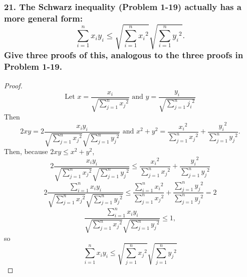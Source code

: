\documentclass{article}
\begin{document}
\subsubsection*{21. The Schwarz inequality (Problem 1-19) actually has a more general form: \[\sum_{i=1}^{n}x_iy_i \le \sqrt{\sum_{i=1}^{n}{x_i}^2}\sqrt{\sum_{i=1}^{n}{y_i}^2}.\] Give three proofs of this, analogous to the three proofs in Problem 1-19.}

\begin{proof}
	\[\text{Let }x = \frac{x_i}{\sqrt{\sum_{j=1}^{n}{x_j}^2}}\text{ and } y = \frac{y_i}{\sqrt{\sum_{j=1}^{n}{j_i}^2}}\]
	Then \[2xy = 2\frac{x_iy_i}{\sqrt{\sum_{j=1}^{n}{x_j}^2}\sqrt{\sum_{j=1}^{n}{y_j}^2}}\text{ and } x^2 + y^2 = \frac{{x_i}^2}{\sum_{j=1}^{n}{x_j}^2} + \frac{{y_i}^2}{\sum_{j=1}^{n}{y_j}^2}.\]
	Then, because $2xy \le x^2 + y^2$,
	\[2\frac{x_iy_i}{\sqrt{\sum_{j=1}^{n}{x_j}^2}\sqrt{\sum_{j=1}^{n}{y_j}^2}} \le \frac{{x_i}^2}{\sum_{j=1}^{n}{x_j}^2} + \frac{{y_i}^2}{\sum_{j=1}^{n}{y_j}^2}\]
	\[2\frac{\sum_{i=1}^{n}x_iy_i}{\sqrt{\sum_{j=1}^{n}{x_j}^2}\sqrt{\sum_{j=1}^{n}{y_j}^2}} \le \frac{\sum_{i=1}^{n}{x_i}^2}{\sum_{j=1}^{n}{x_j}^2} + \frac{\sum_{j=1}^{n}{y_j}^2}{\sum_{j=1}^{n}{y_j}^2} = 2\]
	\[\frac{\sum_{i=1}^{n}x_iy_i}{\sqrt{\sum_{j=1}^{n}{x_j}^2}\sqrt{\sum_{j=1}^{n}{y_j}^2}} \le 1,\] so \[\sum_{i=1}^{n}x_iy_i \le \sqrt{\sum_{j=1}^{n}{x_j}^2}\sqrt{\sum_{j=1}^{n}{y_j}^2}\]
\end{proof}
\end{document}

